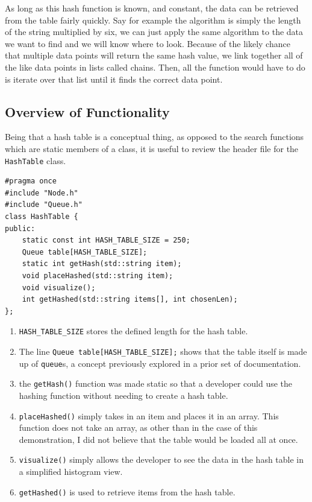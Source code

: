 \documentclass[letterpaper, 10pt]{article}
\begin{document}
As long as this hash function is known, and constant, the data can be retrieved from the table fairly quickly. Say for example the algorithm is simply the length of the string multiplied by six, we can just apply the same algorithm to the data we want to find and we will know where to look. Because of the likely chance that multiple data points will return the same hash value, we link together all of the like data points in lists called chains. Then, all the function would have to do is iterate over that list until it finds the correct data point.

\subsection{Overview of Functionality}

Being that a hash table is a conceptual thing, as opposed to the search functions which are static members of a class, it is useful to review the header file for the \texttt{HashTable} class.



\begin{addmargin}[-5em]{1em}
\begin{small}
\begin{verbatim}
#pragma once
#include "Node.h"
#include "Queue.h"
class HashTable {
public:
	static const int HASH_TABLE_SIZE = 250;
	Queue table[HASH_TABLE_SIZE];
	static int getHash(std::string item);
	void placeHashed(std::string item);
	void visualize();
	int getHashed(std::string items[], int chosenLen);
};
\end{verbatim}
\end{small}
\end{addmargin}
\begin{enumerate}
    \item \texttt{HASH\_TABLE\_SIZE} stores the defined length for the hash table.
    \item  The line \texttt{Queue table[HASH\_TABLE\_SIZE];} shows that the table itself is made up of \texttt{queue}s, a concept previously explored in a prior set of documentation.
    \item the \texttt{getHash()} function was made static so that a developer could use the hashing function without needing to create a hash table.
    \item \texttt{placeHashed()} simply takes in an item and places it in an array. This function does not take an array, as other than in the case of this demonstration, I did not believe that the table would be loaded all at once.
    \item \texttt{visualize()} simply allows the developer to see the data in the hash table in a simplified histogram view.
    \item \texttt{getHashed()} is used to retrieve items from the hash table.
\end{enumerate}
\end{document}
